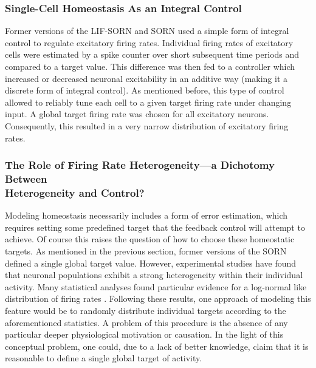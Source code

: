 \documentclass[10pt,a4paper]{article}
\begin{document}
\subsubsection{Single-Cell Homeostasis As an Integral Control}
Former versions of the LIF-SORN and SORN used a simple form of integral control to regulate excitatory firing rates. Individual firing rates of excitatory cells were estimated by a spike counter over short subsequent time periods and compared to a target value. This difference was then fed to a controller which increased or decreased neuronal excitability in an additive way (making it a discrete form of integral control). As mentioned before, this type of control allowed to reliably tune each cell to a given target firing rate under changing input. A global target firing rate was chosen for all excitatory neurons. Consequently, this resulted in a very narrow distribution of excitatory firing rates.

\subsubsection{The Role of Firing Rate Heterogeneity---a Dichotomy Between\\ Heterogeneity and Control?}\label{Section_Role_Fir_Rate_Het}
Modeling homeostasis necessarily includes a form of error estimation, which requires setting some predefined target that the feedback control will attempt to achieve. Of course this raises the question of how to choose these homeostatic targets. As mentioned in the previous section, former versions of the SORN defined a single global target value. However, experimental studies have found that neuronal populations exhibit a strong heterogeneity within their individual activity. Many statistical analyses found particular evidence for a log-normal like distribution of firing rates \cite{Buzsaki_Fir_Rates_2014,Wohrer_Fir_Rates_2012}. Following these results, one approach of modeling this feature would be to randomly distribute individual targets according to the aforementioned statistics. A problem of this procedure is the absence of any particular deeper physiological motivation or causation. In the light of this conceptual problem, one could, due to a lack of better knowledge, claim that it is reasonable to define a single global target of activity.
\end{document}
